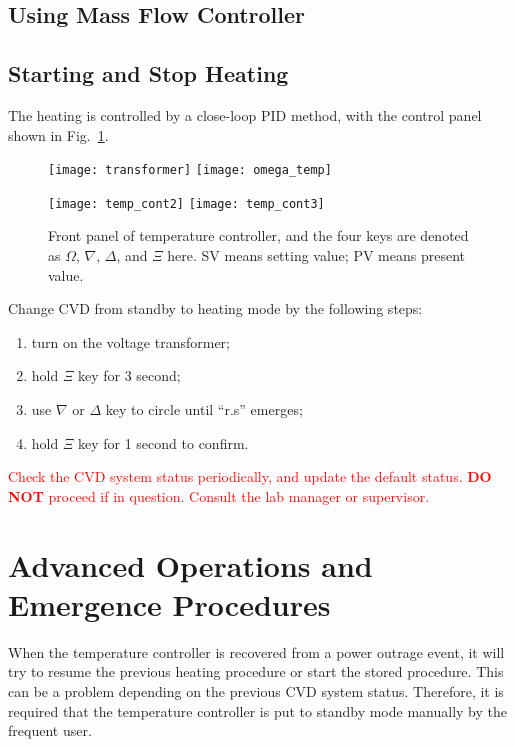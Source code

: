 \subsection{Using Mass Flow Controller}



\subsection{Starting and Stop Heating} 
The heating is controlled by a close-loop PID method, with the control panel shown in Fig.~\ref{fig:omega}. 
\begin{figure}[htb]
\centering
\texttt{[image: transformer]}
\texttt{[image: omega\_temp]}

\texttt{[image: temp\_cont2]}
\texttt{[image: temp\_cont3]}
\caption{Front panel of temperature controller, and the four keys are denoted as $\Omega$, $\nabla$, $\Delta$, and $\Xi$ here. SV means setting value; PV means present value.}
\label{fig:omega}
\end{figure}

Change CVD from standby to heating mode by the following steps:
\begin{enumerate}
\item turn on the voltage transformer; 
\item hold $\Xi$ key for 3 second;
\item use $\nabla$ or $\Delta$ key to circle until ``r.s'' emerges;
\item hold $\Xi$ key for 1 second to confirm.
\end{enumerate}


\textcolor{red}{Check the CVD system status periodically, and update the default status. \textbf{DO NOT} proceed if in question. Consult the lab manager or supervisor.}


\section{Advanced Operations and Emergence Procedures}

When the temperature controller is recovered from a power outrage event, it will try to resume the previous heating procedure or start the stored procedure. This can be a problem depending on the previous CVD system status. Therefore, it is required that the temperature controller is put to standby mode manually by the frequent user. 

